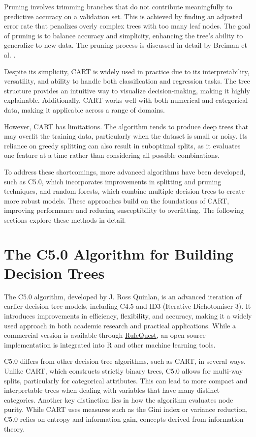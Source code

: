 \documentclass[
  11pt,
]{book}
\theoremstyle{definition}
\theoremstyle{definition}
\theoremstyle{definition}
\theoremstyle{definition}
\theoremstyle{remark}
\begin{document}
Pruning involves trimming branches that do not contribute meaningfully to predictive accuracy on a validation set. This is achieved by finding an adjusted error rate that penalizes overly complex trees with too many leaf nodes. The goal of pruning is to balance accuracy and simplicity, enhancing the tree's ability to generalize to new data. The pruning process is discussed in detail by Breiman et al. \citep{breiman1984classification}.

Despite its simplicity, CART is widely used in practice due to its interpretability, versatility, and ability to handle both classification and regression tasks. The tree structure provides an intuitive way to visualize decision-making, making it highly explainable. Additionally, CART works well with both numerical and categorical data, making it applicable across a range of domains.

However, CART has limitations. The algorithm tends to produce deep trees that may overfit the training data, particularly when the dataset is small or noisy. Its reliance on greedy splitting can also result in suboptimal splits, as it evaluates one feature at a time rather than considering all possible combinations.

To address these shortcomings, more advanced algorithms have been developed, such as C5.0, which incorporates improvements in splitting and pruning techniques, and random forests, which combine multiple decision trees to create more robust models. These approaches build on the foundations of CART, improving performance and reducing susceptibility to overfitting. The following sections explore these methods in detail.

\section{The C5.0 Algorithm for Building Decision Trees}\label{the-c5.0-algorithm-for-building-decision-trees}

The C5.0 algorithm, developed by J. Ross Quinlan, is an advanced iteration of earlier decision tree models, including C4.5 and ID3 (Iterative Dichotomiser 3). It introduces improvements in efficiency, flexibility, and accuracy, making it a widely used approach in both academic research and practical applications. While a commercial version is available through \href{http://www.rulequest.com/}{RuleQuest}, an open-source implementation is integrated into R and other machine learning tools.

C5.0 differs from other decision tree algorithms, such as CART, in several ways. Unlike CART, which constructs strictly binary trees, C5.0 allows for multi-way splits, particularly for categorical attributes. This can lead to more compact and interpretable trees when dealing with variables that have many distinct categories. Another key distinction lies in how the algorithm evaluates node purity. While CART uses measures such as the Gini index or variance reduction, C5.0 relies on entropy and information gain, concepts derived from information theory.
\end{document}
